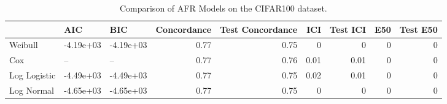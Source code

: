 \begin{table*}
\centering
\caption{Comparison of AFR Models on the CIFAR100 dataset.}
\label{tab:cifar100}
\begin{tabular}{lllrrrrrr}
\toprule
 & AIC & BIC & Concordance & Test Concordance & ICI & Test ICI & E50 & Test E50 \\
\midrule
Weibull & -4.19e+03 & -4.19e+03 & 0.77 & 0.75 & 0 & 0 & 0 & 0 \\
Cox & -- & -- & 0.77 & 0.76 & 0.01 & 0.01 & 0 & 0 \\
Log Logistic & -4.49e+03 & -4.49e+03 & 0.77 & 0.75 & 0.02 & 0.01 & 0 & 0 \\
Log Normal & -4.65e+03 & -4.65e+03 & 0.77 & 0.75 & 0 & 0 & 0 & 0 \\
\bottomrule
\end{tabular}
\end{table*}
